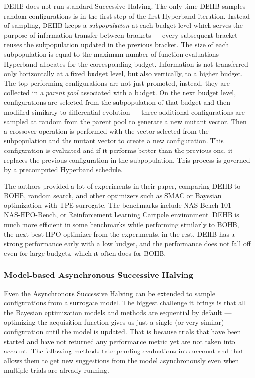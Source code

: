 DEHB does not run standard Successive Halving. The only time DEHB samples random configurations is in the first step of the first Hyperband iteration. Instead of sampling, DEHB keeps a \textit{subpopulation} at each budget level which serves the purpose of information transfer between brackets --- every subsequent bracket reuses the subpopulation updated in the previous bracket. The size of each subpopulation is equal to the maximum number of function evaluations Hyperband allocates for the corresponding budget. Information is not transferred only horizontally at a fixed budget level, but also vertically, to a higher budget. The top-performing configurations are not just promoted, instead, they are collected in a \textit{parent pool} associated with a budget. On the next budget level, configurations are selected from the subpopulation of that budget and then modified similarly to differential evolution --- three additional configurations are sampled at random from the parent pool to generate a new mutant vector. Then a crossover operation is performed with the vector selected from the subpopulation and the mutant vector to create a new configuration. This configuration is evaluated and if it performs better than the previous one, it replaces the previous configuration in the subpopulation. This process is governed by a precomputed Hyperband schedule.

The authors provided a lot of experiments in their paper, comparing DEHB to BOHB, random search, and other optimizers such as SMAC or Bayesian optimization with TPE surrogate. The benchmarks include NAS-Bench-101, NAS-HPO-Bench, or Reinforcement Learning Cartpole environment. DEHB is much more efficient in some benchmarks while performing similarly to BOHB, the next-best HPO optimizer from the experiments, in the rest. DEHB has a strong performance early with a low budget, and the performance does not fall off even for large budgets, which it often does for BOHB.\@

\subsubsection{Model-based Asynchronous Successive Halving}
Even the Asynchronous Successive Halving can be extended to sample configurations from a surrogate model. The biggest challenge it brings is that all the Bayesian optimization models and methods are sequential by default --- optimizing the acquisition function gives us just a single (or very similar) configuration until the model is updated. That is because trials that have been started and have not returned any performance metric yet are not taken into account. The following methods take pending evaluations into account and that allows them to get new suggestions from the model asynchronously even when multiple trials are already running.

